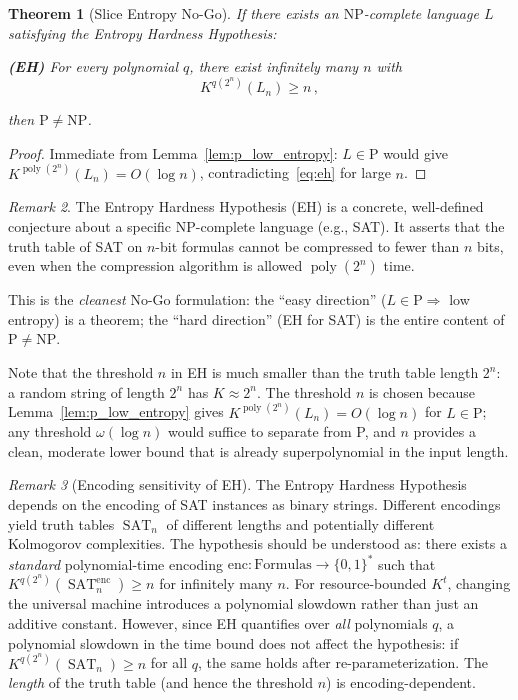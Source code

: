 \documentclass[aps,prd,twocolumn,superscriptaddress,nofootinbib]{revtex4-2}
\newtheorem{theorem}{Theorem}[section]
\theoremstyle{definition}
\theoremstyle{remark}
\newtheorem{remark}[theorem]{Remark}
\DeclareMathOperator{\poly}{poly}
\DeclareMathOperator{\SAT}{SAT}
\newcommand{\NP}{\mathrm{NP}}
\newcommand{\PP}{\mathrm{P}}
\begin{document}
\begin{theorem}[Slice Entropy No-Go]
\label{thm:slice_nogo}
If there exists an $\NP$-complete language $L$ satisfying the \textit{Entropy Hardness Hypothesis}:

\textbf{(EH)} For every polynomial $q$, there exist infinitely many $n$ with
\begin{equation}
K^{q(2^n)}(L_n) \geq n\,,
\label{eq:eh}
\end{equation}

then $\PP \neq \NP$.
\end{theorem}

\begin{proof}
Immediate from Lemma~\ref{lem:p_low_entropy}: $L \in \PP$ would give $K^{\poly(2^n)}(L_n) = O(\log n)$, contradicting~\eqref{eq:eh} for large $n$.
\end{proof}

\begin{remark}
The Entropy Hardness Hypothesis (EH) is a concrete, well-defined conjecture about a specific NP-complete language (e.g., SAT). It asserts that the truth table of SAT on $n$-bit formulas cannot be compressed to fewer than $n$ bits, even when the compression algorithm is allowed $\poly(2^n)$ time.

This is the \textit{cleanest} No-Go formulation: the ``easy direction'' ($L \in \PP \Rightarrow$ low entropy) is a theorem; the ``hard direction'' (EH for SAT) is the entire content of $\PP \neq \NP$.

Note that the threshold $n$ in EH is much smaller than the truth table length $2^n$: a random string of length $2^n$ has $K \approx 2^n$. The threshold $n$ is chosen because Lemma~\ref{lem:p_low_entropy} gives $K^{\poly(2^n)}(L_n) = O(\log n)$ for $L \in \PP$; any threshold $\omega(\log n)$ would suffice to separate from P, and $n$ provides a clean, moderate lower bound that is already superpolynomial in the input length.
\end{remark}

\begin{remark}[Encoding sensitivity of EH]
\label{rem:encoding}
The Entropy Hardness Hypothesis depends on the encoding of SAT instances as binary strings. Different encodings yield truth tables $\SAT_n$ of different lengths and potentially different Kolmogorov complexities. The hypothesis should be understood as: there exists a \emph{standard} polynomial-time encoding $\mathrm{enc}: \mathrm{Formulas} \to \{0,1\}^*$ such that $K^{q(2^n)}(\SAT_n^{\mathrm{enc}}) \geq n$ for infinitely many $n$. For resource-bounded $K^t$, changing the universal machine introduces a polynomial slowdown rather than just an additive constant. However, since EH quantifies over \emph{all} polynomials $q$, a polynomial slowdown in the time bound does not affect the hypothesis: if $K^{q(2^n)}(\SAT_n) \geq n$ for all $q$, the same holds after re-parameterization. The \emph{length} of the truth table (and hence the threshold $n$) is encoding-dependent.
\end{remark}
\end{document}

